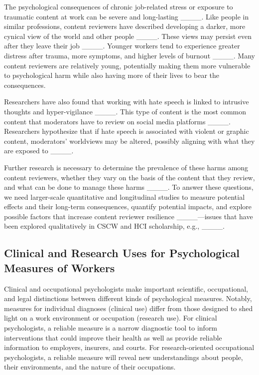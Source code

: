 The psychological consequences of chronic job-related stress or exposure to traumatic content at work can be severe and long-lasting ____. Like people in similar professions, content reviewers have described developing a darker, more cynical view of the world and other people ____. These views may persist even after they leave their job ____. Younger workers tend to experience greater distress after trauma, more symptoms, and higher levels of burnout ____. Many content reviewers are relatively young, potentially making them more vulnerable to psychological harm while also having more of their lives to bear the consequences.

Researchers have also found that working with hate speech is linked to intrusive thoughts and hyper-vigilance ____. This type of content is the most common content that moderators have to review on social media platforms ____. Researchers hypothesize that if hate speech is associated with violent or graphic content, moderators' worldviews may be altered, possibly aligning with what they are exposed to ____.

Further research is necessary to determine the prevalence of these harms among content reviewers, whether they vary on the basis of the content that they review, and what can be done to manage these harms ____. To answer these questions, we need larger-scale quantitative and longitudinal studies to measure potential effects and their long-term consequences, quantify potential impacts, and explore possible factors that increase content reviewer resilience ____—issues that have been explored qualitatively in CSCW and HCI scholarship, e.g., ____.

\subsection{Clinical and Research Uses for Psychological Measures of Workers}
Clinical and occupational psychologists make important scientific, occupational, and legal distinctions between different kinds of psychological measures. Notably, measures for individual diagnoses (clinical use) differ from those designed to shed light on a work environment or occupation (research use). For clinical psychologists, a reliable measure is a narrow diagnostic tool to inform interventions that could improve their health as well as provide reliable information to employers, insurers, and courts. For research-oriented occupational psychologists, a reliable measure will reveal new understandings about people, their environments, and the nature of their occupations.

